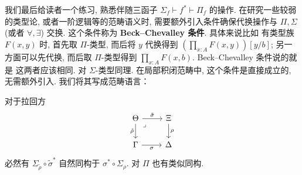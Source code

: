 我们最后给读者一个练习, 熟悉伴随三函子 \(\Sigma_f \vdash f^* \vdash \Pi_f\)
的操作. 在研究一些较弱的类型论, 或者一阶逻辑等的范畴语义时,
需要额外引入条件确保代换操作与 \(\Pi, \Sigma\) (或者
\(\forall, \exists\)) 交换. 这个条件称为
\textbf{Beck--Chevalley 条件}. 具体来说比如
有类型族 \(F(x,y)\) 时, 首先取 \(\Pi\)-类型, 而后将
\(y\) 代换得到 \(\left(\prod_{x:A} F(x, y)\right)[y/b]\);
另一方面可以先代换, 而后取 \(\Pi\)-类型得到
\(\prod_{x:A} F(x, b)\). Beck--Chevalley 条件说的就是
这两者应该相同. 对 \(\Sigma\)-类型同理. 在局部积闭范畴中,
这个条件是直接成立的, 无需额外引入. 我们将其写成范畴语言：
\begin{theorem}
对于拉回方
\[\begin{tikzcd}
  \Theta & \Xi \\
  \Gamma & \Delta
  \arrow["{\tilde\rho}"', from=1-1, to=2-1]
  \arrow["\sigma"', from=2-1, to=2-2]
  \arrow["\rho", from=1-2, to=2-2]
  \arrow["{\tilde\sigma}", from=1-1, to=1-2]
  \arrow["\lrcorner"{anchor=center, pos=0.125}, draw=none, from=1-1, to=2-2]
\end{tikzcd}\]
必然有 \(\Sigma_{\tilde\rho} \circ \tilde\sigma^*\) 自然同构于
\(\sigma^* \circ \Sigma_{\rho}\). 对 \(\Pi\) 也有类似同构.
\end{theorem}
